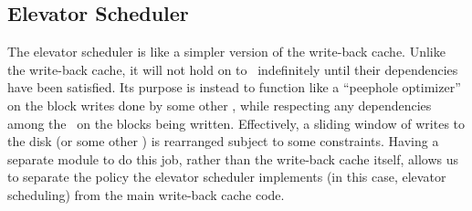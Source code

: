 \subsection{Elevator Scheduler}
\label{sec:modules:elevator}

The elevator scheduler is like a simpler version of the write-back cache. Unlike
the write-back cache, it will not hold on to \chdescs\ indefinitely until their
dependencies have been satisfied. Its purpose is instead to function like a
``peephole optimizer'' on the block writes done by some other \module, while
respecting any dependencies among the \chdescs\ on the blocks being written.
Effectively, a sliding window of writes to the disk (or some other \module) is
rearranged subject to some constraints. Having a separate module to do this job,
rather than the write-back cache itself, allows us to separate the policy the
elevator scheduler implements (in this case, elevator scheduling) from the main
write-back cache code.
